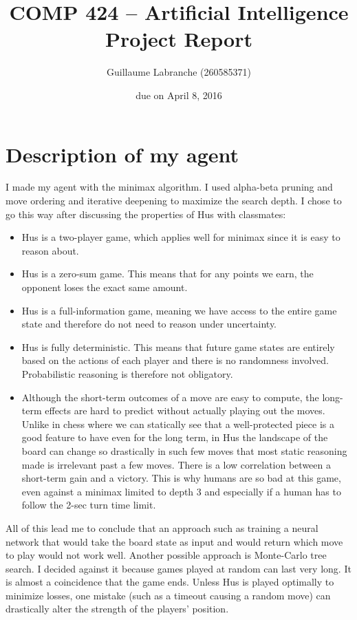 \documentclass{article}
\author{Guillaume Labranche (260585371)}
\title{COMP 424 -- Artificial Intelligence\\Project Report}
\date{due on April 8, 2016}
\begin{document}
\maketitle

\section{Description of my agent}

I made my agent with the minimax algorithm. I used alpha-beta pruning and move ordering and iterative deepening to maximize the search depth. I chose to go this way after discussing the properties of Hus with classmates:
\begin{itemize}
\item Hus is a two-player game, which applies well for minimax since it is easy to reason about.
\item Hus is a zero-sum game. This means that for any points we earn, the opponent loses the exact same amount.
\item Hus is a full-information game, meaning we have access to the entire game state and therefore do not need to reason under uncertainty.
\item Hus is fully deterministic. This means that future game states are entirely based on the actions of each player and there is no randomness involved. Probabilistic reasoning is therefore not obligatory.
\item Although the short-term outcomes of a move are easy to compute, the long-term effects are hard to predict without actually playing out the moves. Unlike in chess where we can statically see that a well-protected piece is a good feature to have even for the long term, in Hus the landscape of the board can change so drastically in such few moves that most static reasoning made is irrelevant past a few moves. There is a low correlation between a short-term gain and a victory. This is why humans are so bad at this game, even against a minimax limited to depth 3 and especially if a human has to follow the 2-sec turn time limit.
\end{itemize}

All of this lead me to conclude that an approach such as training a neural network that would take the board state as input and would return which move to play would not work well. Another possible approach is Monte-Carlo tree search. I decided against it because games played at random can last very long. It is almost a coincidence that the game ends. Unless Hus is played optimally to minimize losses, one mistake (such as a timeout causing a random move) can drastically alter the strength of the players' position.
\end{document}
